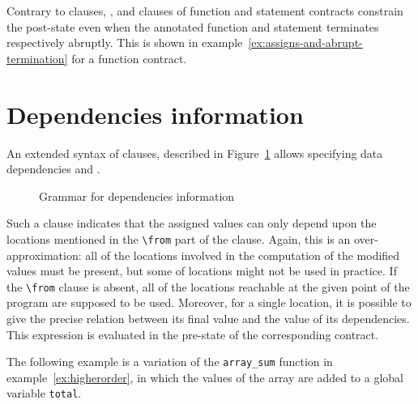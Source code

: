 Contrary to \ensures clauses, \assigns{}, 
\allocates{} and \frees{} clauses of function 
and statement contracts constrain the post-state 
even when the annotated function and statement terminates respectively abruptly. 
This is shown in example~\ref{ex:assigns-and-abrupt-termination} for a function contract.


\section{Dependencies information}
\label{sec:func-dep}

\experimental

An extended syntax of \assigns clauses, described in
Figure~\ref{fig:gram:dep} allows specifying data
dependencies and
.

\begin{figure}[t]
  \begin{cadre}
      
    \end{cadre}
  \caption{Grammar for dependencies information}
\label{fig:gram:dep}
\end{figure}

Such a clause indicates that the assigned values can only depend upon
the locations mentioned in the \lstinline|\from| part of the
clause. Again, this is an over-approximation: all of the locations
involved in the computation of the modified values must be present,
but some of locations might not be used in practice. If the
\lstinline|\from| clause is absent, all of the locations reachable at the
given point of the program are supposed to be used.
Moreover, for a single location, it is possible to give the precise
relation between its final value and the value of its
dependencies. This expression is evaluated in the pre-state of the
corresponding contract.

\begin{example}
  The following example is a variation of the \lstinline+array_sum+
  function in example~\ref{ex:higherorder}, in which the values of
  the array are added to a global variable \lstinline+total+.


\end{example}


